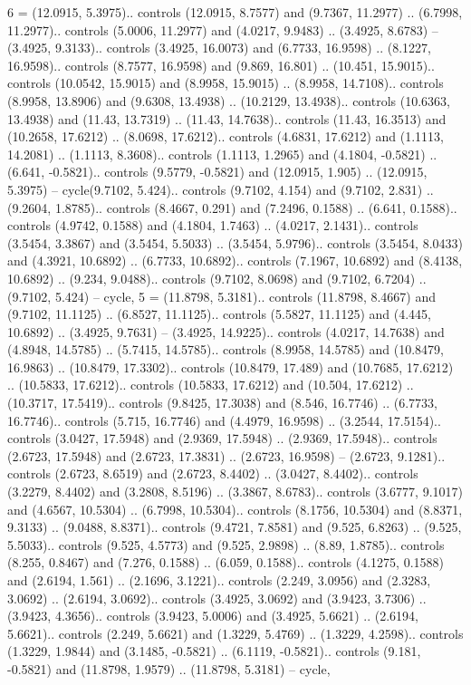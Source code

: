 {6} = {(12.0915, 5.3975).. controls (12.0915, 8.7577) and (9.7367, 11.2977) .. (6.7998, 11.2977).. controls (5.0006, 11.2977) and (4.0217, 9.9483) .. (3.4925, 8.6783) -- (3.4925, 9.3133).. controls (3.4925, 16.0073) and (6.7733, 16.9598) .. (8.1227, 16.9598).. controls (8.7577, 16.9598) and (9.869, 16.801) .. (10.451, 15.9015).. controls (10.0542, 15.9015) and (8.9958, 15.9015) .. (8.9958, 14.7108).. controls (8.9958, 13.8906) and (9.6308, 13.4938) .. (10.2129, 13.4938).. controls (10.6363, 13.4938) and (11.43, 13.7319) .. (11.43, 14.7638).. controls (11.43, 16.3513) and (10.2658, 17.6212) .. (8.0698, 17.6212).. controls (4.6831, 17.6212) and (1.1113, 14.2081) .. (1.1113, 8.3608).. controls (1.1113, 1.2965) and (4.1804, -0.5821) .. (6.641, -0.5821).. controls (9.5779, -0.5821) and (12.0915, 1.905) .. (12.0915, 5.3975) -- cycle(9.7102, 5.424).. controls (9.7102, 4.154) and (9.7102, 2.831) .. (9.2604, 1.8785).. controls (8.4667, 0.291) and (7.2496, 0.1588) .. (6.641, 0.1588).. controls (4.9742, 0.1588) and (4.1804, 1.7463) .. (4.0217, 2.1431).. controls (3.5454, 3.3867) and (3.5454, 5.5033) .. (3.5454, 5.9796).. controls (3.5454, 8.0433) and (4.3921, 10.6892) .. (6.7733, 10.6892).. controls (7.1967, 10.6892) and (8.4138, 10.6892) .. (9.234, 9.0488).. controls (9.7102, 8.0698) and (9.7102, 6.7204) .. (9.7102, 5.424) -- cycle},
{5} = {(11.8798, 5.3181).. controls (11.8798, 8.4667) and (9.7102, 11.1125) .. (6.8527, 11.1125).. controls (5.5827, 11.1125) and (4.445, 10.6892) .. (3.4925, 9.7631) -- (3.4925, 14.9225).. controls (4.0217, 14.7638) and (4.8948, 14.5785) .. (5.7415, 14.5785).. controls (8.9958, 14.5785) and (10.8479, 16.9863) .. (10.8479, 17.3302).. controls (10.8479, 17.489) and (10.7685, 17.6212) .. (10.5833, 17.6212).. controls (10.5833, 17.6212) and (10.504, 17.6212) .. (10.3717, 17.5419).. controls (9.8425, 17.3038) and (8.546, 16.7746) .. (6.7733, 16.7746).. controls (5.715, 16.7746) and (4.4979, 16.9598) .. (3.2544, 17.5154).. controls (3.0427, 17.5948) and (2.9369, 17.5948) .. (2.9369, 17.5948).. controls (2.6723, 17.5948) and (2.6723, 17.3831) .. (2.6723, 16.9598) -- (2.6723, 9.1281).. controls (2.6723, 8.6519) and (2.6723, 8.4402) .. (3.0427, 8.4402).. controls (3.2279, 8.4402) and (3.2808, 8.5196) .. (3.3867, 8.6783).. controls (3.6777, 9.1017) and (4.6567, 10.5304) .. (6.7998, 10.5304).. controls (8.1756, 10.5304) and (8.8371, 9.3133) .. (9.0488, 8.8371).. controls (9.4721, 7.8581) and (9.525, 6.8263) .. (9.525, 5.5033).. controls (9.525, 4.5773) and (9.525, 2.9898) .. (8.89, 1.8785).. controls (8.255, 0.8467) and (7.276, 0.1588) .. (6.059, 0.1588).. controls (4.1275, 0.1588) and (2.6194, 1.561) .. (2.1696, 3.1221).. controls (2.249, 3.0956) and (2.3283, 3.0692) .. (2.6194, 3.0692).. controls (3.4925, 3.0692) and (3.9423, 3.7306) .. (3.9423, 4.3656).. controls (3.9423, 5.0006) and (3.4925, 5.6621) .. (2.6194, 5.6621).. controls (2.249, 5.6621) and (1.3229, 5.4769) .. (1.3229, 4.2598).. controls (1.3229, 1.9844) and (3.1485, -0.5821) .. (6.1119, -0.5821).. controls (9.181, -0.5821) and (11.8798, 1.9579) .. (11.8798, 5.3181) -- cycle},
